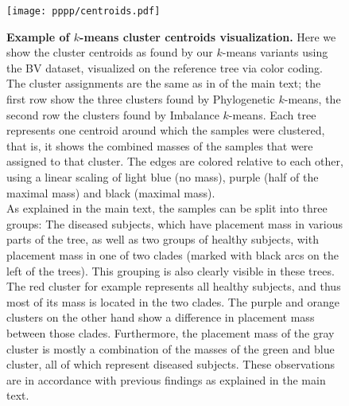 \begin{figure}[hpbt]
    \centering
    \texttt{[image: pppp/centroids.pdf]}
    \caption[Example of $k$-means cluster centroids visualization]{
        \textbf{Example of $k$-means cluster centroids visualization.}
        Here we show the cluster centroids as found by our $k$-means variants using the \ac{BV} dataset,
        visualized on the reference tree via color coding.
        The cluster assignments are the same as in  of the main text;
        the first row show the three clusters found by Phylogenetic $k$-means,
        the second row the clusters found by Imbalance $k$-means.
        Each tree represents one centroid around which the samples were clustered,
        that is, it shows the combined masses of the samples that were assigned to that cluster.
        The edges are colored relative to each other, using a linear scaling of
        light blue (no mass), purple (half of the maximal mass) and black (maximal mass).
        \\
        As explained in the main text, the samples can be split into three groups:
        The diseased subjects, which have placement mass in various parts of the tree,
        as well as two groups of healthy subjects, with placement mass in one of two  clades
        (marked with black arcs on the left of the trees).
        This grouping is also clearly visible in these trees.
        The red cluster for example represents all healthy subjects,
        and thus most of its mass is located in the two  clades.
        The purple and orange clusters on the other hand show a difference in placement mass between those clades.
        Furthermore, the placement mass of the gray cluster is mostly
        a combination of the masses of the green and blue cluster,
        all of which represent diseased subjects.
        These observations are in accordance with previous findings as explained in the main text.
    }
    \label{fig:centroids}
\end{figure}


